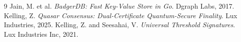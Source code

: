 \documentclass[11pt,letterpaper]{article}
\begin{document}

\begin{thebibliography}{9}
 Jain, M. et al. \textit{BadgerDB: Fast Key-Value Store in Go}. Dgraph Labs, 2017.
 Kelling, Z. \textit{Quasar Consensus: Dual-Certificate Quantum-Secure Finality}. Lux Industries, 2025.
 Kelling, Z. and Seesahai, V. \textit{Universal Threshold Signatures}. Lux Industries Inc, 2021.
\end{thebibliography}
\end{document}
